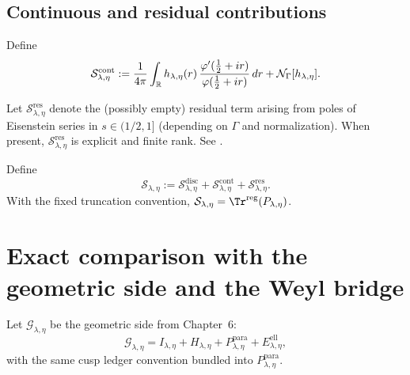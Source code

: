 \subsection{Continuous and residual contributions}\label{subsec:ch7-cont-res}

\begin{definition}\label{def:7.S.cont}
Define
\begin{equation}\label{eq:7.S.cont}
\mathcal S^{\mathrm{cont}}_{\lambda,\eta}
:=\frac{1}{4\pi}\int_{\mathbb{R}} h_{\lambda,\eta}(r)\,
\frac{\varphi'(\tfrac12+ir)}{\varphi(\tfrac12+ir)}\,dr
+\mathcal N_\Gamma[h_{\lambda,\eta}].
\end{equation}
\end{definition}

\begin{definition}\label{def:7.S.res}
Let $\mathcal S^{\mathrm{res}}_{\lambda,\eta}$ denote the (possibly empty) residual term arising from poles of Eisenstein series
in $s\in(1/2,1]$ (depending on $\Gamma$ and normalization). When present, $\mathcal S^{\mathrm{res}}_{\lambda,\eta}$ is explicit and finite rank.
See \cite{Hejhal1983,Iwaniec2002}.
\end{definition}

\begin{definition}\label{def:7.S.full}
Define
\begin{equation}\label{eq:7.S.full}
\mathcal S_{\lambda,\eta}
:=\mathcal S^{\mathrm{disc}}_{\lambda,\eta}
+\mathcal S^{\mathrm{cont}}_{\lambda,\eta}
+\mathcal S^{\mathrm{res}}_{\lambda,\eta}.
\end{equation}
With the fixed truncation convention, $\mathcal S_{\lambda,\eta}=\Tr^{\mathrm{reg}}(P_{\lambda,\eta})$.
\end{definition}

\section{Exact comparison with the geometric side and the Weyl bridge}\label{sec:ch7-comparison}

Let $\mathcal G_{\lambda,\eta}$ be the geometric side from Chapter~6:
\begin{equation}\label{eq:7.G.recall}
\mathcal G_{\lambda,\eta}
=I_{\lambda,\eta}+H_{\lambda,\eta}+P_{\lambda,\eta}^{\mathrm{para}}+E_{\lambda,\eta}^{\mathrm{ell}},
\end{equation}
with the same cusp ledger convention bundled into $P_{\lambda,\eta}^{\mathrm{para}}$.

